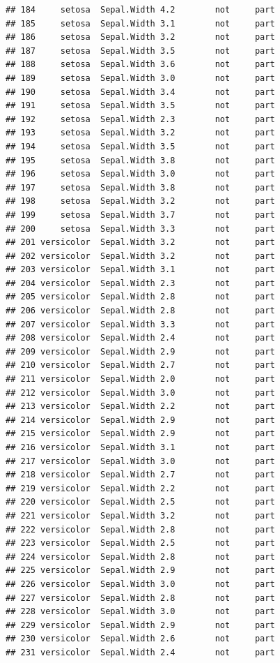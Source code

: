 \documentclass[krantz2]{krantz}\usepackage{knitr}%
\begin{document}
\begin{knitrout}
\begin{kframe}
\begin{verbatim}
## 184     setosa  Sepal.Width 4.2        not     part
## 185     setosa  Sepal.Width 3.1        not     part
## 186     setosa  Sepal.Width 3.2        not     part
## 187     setosa  Sepal.Width 3.5        not     part
## 188     setosa  Sepal.Width 3.6        not     part
## 189     setosa  Sepal.Width 3.0        not     part
## 190     setosa  Sepal.Width 3.4        not     part
## 191     setosa  Sepal.Width 3.5        not     part
## 192     setosa  Sepal.Width 2.3        not     part
## 193     setosa  Sepal.Width 3.2        not     part
## 194     setosa  Sepal.Width 3.5        not     part
## 195     setosa  Sepal.Width 3.8        not     part
## 196     setosa  Sepal.Width 3.0        not     part
## 197     setosa  Sepal.Width 3.8        not     part
## 198     setosa  Sepal.Width 3.2        not     part
## 199     setosa  Sepal.Width 3.7        not     part
## 200     setosa  Sepal.Width 3.3        not     part
## 201 versicolor  Sepal.Width 3.2        not     part
## 202 versicolor  Sepal.Width 3.2        not     part
## 203 versicolor  Sepal.Width 3.1        not     part
## 204 versicolor  Sepal.Width 2.3        not     part
## 205 versicolor  Sepal.Width 2.8        not     part
## 206 versicolor  Sepal.Width 2.8        not     part
## 207 versicolor  Sepal.Width 3.3        not     part
## 208 versicolor  Sepal.Width 2.4        not     part
## 209 versicolor  Sepal.Width 2.9        not     part
## 210 versicolor  Sepal.Width 2.7        not     part
## 211 versicolor  Sepal.Width 2.0        not     part
## 212 versicolor  Sepal.Width 3.0        not     part
## 213 versicolor  Sepal.Width 2.2        not     part
## 214 versicolor  Sepal.Width 2.9        not     part
## 215 versicolor  Sepal.Width 2.9        not     part
## 216 versicolor  Sepal.Width 3.1        not     part
## 217 versicolor  Sepal.Width 3.0        not     part
## 218 versicolor  Sepal.Width 2.7        not     part
## 219 versicolor  Sepal.Width 2.2        not     part
## 220 versicolor  Sepal.Width 2.5        not     part
## 221 versicolor  Sepal.Width 3.2        not     part
## 222 versicolor  Sepal.Width 2.8        not     part
## 223 versicolor  Sepal.Width 2.5        not     part
## 224 versicolor  Sepal.Width 2.8        not     part
## 225 versicolor  Sepal.Width 2.9        not     part
## 226 versicolor  Sepal.Width 3.0        not     part
## 227 versicolor  Sepal.Width 2.8        not     part
## 228 versicolor  Sepal.Width 3.0        not     part
## 229 versicolor  Sepal.Width 2.9        not     part
## 230 versicolor  Sepal.Width 2.6        not     part
## 231 versicolor  Sepal.Width 2.4        not     part

\end{verbatim}
\end{kframe}
\end{knitrout}
\end{document}
